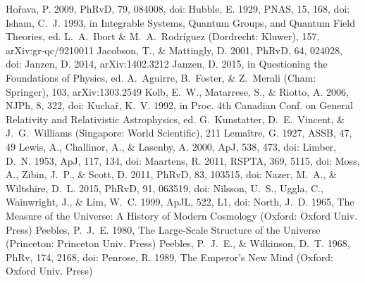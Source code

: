 \documentclass[twocolumn]{aastex701}
\begin{document}
\begin{thebibliography}{}
 Ho{\v r}ava, P. 2009, PhRvD, 79, 084008, doi:
 Hubble, E. 1929, PNAS, 15, 168, doi:
 Isham, C.~J. 1993, in Integrable Systems, Quantum Groups, and Quantum Field Theories, ed. L.~A.~Ibort \& M.~A.~Rodr\'iguez (Dordrecht: Kluwer), 157, arXiv:gr-qc/9210011
 Jacobson, T., \& Mattingly, D. 2001, PhRvD, 64, 024028, doi:
 Janzen, D. 2014, arXiv:1402.3212
 Janzen, D. 2015, in Questioning the Foundations of Physics, ed. A.~Aguirre, B.~Foster, \& Z.~Merali (Cham: Springer), 103, arXiv:1303.2549
 Kolb, E.~W., Matarrese, S., \& Riotto, A. 2006, NJPh, 8, 322, doi:
 Kucha{\v r}, K.~V. 1992, in Proc. 4th Canadian Conf. on General Relativity and Relativistic Astrophysics, ed. G.~Kunstatter, D.~E.~Vincent, \& J.~G.~Williams (Singapore: World Scientific), 211
 Lema{\^i}tre, G. 1927, ASSB, 47, 49
 Lewis, A., Challinor, A., \& Lasenby, A. 2000, ApJ, 538, 473, doi:
 Limber, D.~N. 1953, ApJ, 117, 134, doi:
 Maartens, R. 2011, RSPTA, 369, 5115, doi:
 Moss, A., Zibin, J.~P., \& Scott, D. 2011, PhRvD, 83, 103515, doi:
 Nazer, M.~A., \& Wiltshire, D.~L. 2015, PhRvD, 91, 063519, doi:
 Nilsson, U.~S., Uggla, C., Wainwright, J., \& Lim, W.~C. 1999, ApJL, 522, L1, doi:
 North, J.~D. 1965, The Measure of the Universe: A History of Modern Cosmology (Oxford: Oxford Univ. Press)
 Peebles, P.~J.~E. 1980, The Large-Scale Structure of the Universe (Princeton: Princeton Univ. Press)
 Peebles, P.~J.~E., \& Wilkinson, D.~T. 1968, PhRv, 174, 2168, doi:
 Penrose, R. 1989, The Emperor's New Mind (Oxford: Oxford Univ. Press)

\end{thebibliography}
\end{document}
